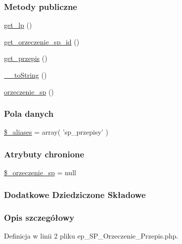 \subsubsection*{Metody publiczne}
\begin{DoxyCompactItemize}
\item 
\hyperlink{classep___s_p___orzeczenie___przepis_af494981dea72d3642ed065d50f9a2db7}{get\-\_\-lp} ()
\item 
\hyperlink{classep___s_p___orzeczenie___przepis_a98a84a7375b3d05cb4516bbb2c7f3e04}{get\-\_\-orzeczenie\-\_\-sp\-\_\-id} ()
\item 
\hyperlink{classep___s_p___orzeczenie___przepis_ae5b24c445c7c4aa3596a9031016c41af}{get\-\_\-przepis} ()
\item 
\hyperlink{classep___s_p___orzeczenie___przepis_a7516ca30af0db3cdbf9a7739b48ce91d}{\-\_\-\-\_\-to\-String} ()
\item 
\hyperlink{classep___s_p___orzeczenie___przepis_a498c7b61096c1bcb941e93a8d1385318}{orzeczenie\-\_\-sp} ()
\end{DoxyCompactItemize}
\subsubsection*{Pola danych}
\begin{DoxyCompactItemize}
\item 
\hyperlink{classep___s_p___orzeczenie___przepis_ab4e31d75f0bc5d512456911e5d01366b}{\$\-\_\-aliases} = array( 'sp\-\_\-przepisy' )
\end{DoxyCompactItemize}
\subsubsection*{Atrybuty chronione}
\begin{DoxyCompactItemize}
\item 
\hyperlink{classep___s_p___orzeczenie___przepis_aa2e1ecb50e6fae26a854ac995f7226b8}{\$\-\_\-orzeczenie\-\_\-sp} = null
\end{DoxyCompactItemize}
\subsubsection*{Dodatkowe Dziedziczone Składowe}


\subsubsection{Opis szczegółowy}


Definicja w linii 2 pliku ep\-\_\-\-S\-P\-\_\-\-Orzeczenie\-\_\-\-Przepis.\-php.



